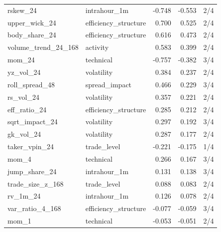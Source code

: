 \begin{tabular}{llrrl}
rskew_24 & intrahour_1m & -0.748 & -0.553 & 2/4 \\
upper_wick_24 & efficiency_structure & 0.700 & 0.525 & 2/4 \\
body_share_24 & efficiency_structure & 0.616 & 0.473 & 2/4 \\
volume_trend_24_168 & activity & 0.583 & 0.399 & 2/4 \\
mom_24 & technical & -0.757 & -0.382 & 3/4 \\
yz_vol_24 & volatility & 0.384 & 0.237 & 2/4 \\
roll_spread_48 & spread_impact & 0.466 & 0.229 & 3/4 \\
rs_vol_24 & volatility & 0.357 & 0.221 & 2/4 \\
eff_ratio_24 & efficiency_structure & 0.285 & 0.212 & 2/4 \\
sqrt_impact_24 & volatility & 0.297 & 0.192 & 3/4 \\
gk_vol_24 & volatility & 0.287 & 0.177 & 2/4 \\
taker_vpin_24 & trade_level & -0.221 & -0.175 & 1/4 \\
mom_4 & technical & 0.266 & 0.167 & 3/4 \\
jump_share_24 & intrahour_1m & 0.131 & 0.138 & 3/4 \\
trade_size_z_168 & trade_level & 0.088 & 0.083 & 2/4 \\
rv_1m_24 & intrahour_1m & 0.126 & 0.078 & 2/4 \\
var_ratio_4_168 & efficiency_structure & -0.077 & -0.059 & 3/4 \\
mom_1 & technical & -0.053 & -0.051 & 2/4 \\
\bottomrule
\end{tabular}
